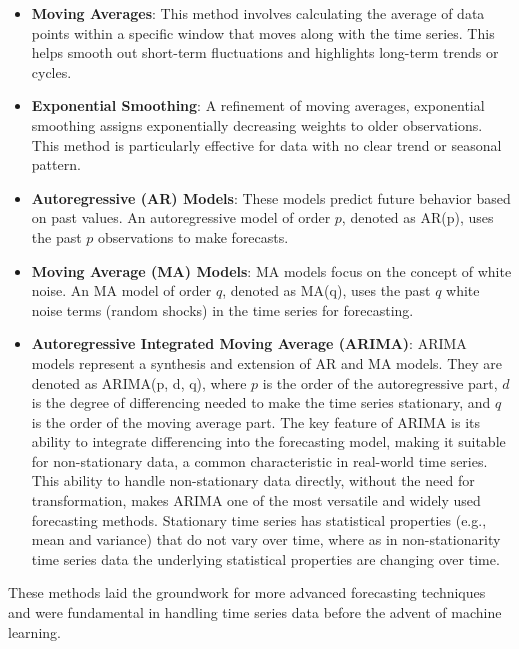 \begin{itemize}
    \item \textbf{Moving Averages}: This method involves calculating the average of data points within a specific window that moves along with the time series. This helps smooth out short-term fluctuations and highlights long-term trends or cycles.
    
    \item \textbf{Exponential Smoothing}: A refinement of moving averages, exponential smoothing assigns exponentially decreasing weights to older observations. This method is particularly effective for data with no clear trend or seasonal pattern.
    
    \item \textbf{Autoregressive (AR) Models}: These models predict future behavior based on past values. An autoregressive model of order \( p \), denoted as AR(p), uses the past \( p \) observations to make forecasts.

     \item \textbf{Moving Average (MA) Models}: MA models focus on the concept of white noise. An MA model of order \( q \), denoted as MA(q), uses the past \( q \) white noise terms (random shocks) in the time series for forecasting.
    
    \item \textbf{Autoregressive Integrated Moving Average (ARIMA)}: ARIMA models represent a synthesis and extension of AR and MA models. They are denoted as ARIMA(p, d, q), where \( p \) is the order of the autoregressive part, \( d \) is the degree of differencing needed to make the time series stationary, and \( q \) is the order of the moving average part. The key feature of ARIMA is its ability to integrate differencing into the forecasting model, making it suitable for non-stationary data, a common characteristic in real-world time series. This ability to handle non-stationary data directly, without the need for transformation, makes ARIMA one of the most versatile and widely used forecasting methods. Stationary time series has statistical properties (e.g., mean and variance) that do not vary over time, where as in non-stationarity time series data the underlying statistical properties are changing over time.
\end{itemize}

These methods laid the groundwork for more advanced forecasting techniques and were fundamental in handling time series data before the advent of machine learning.

